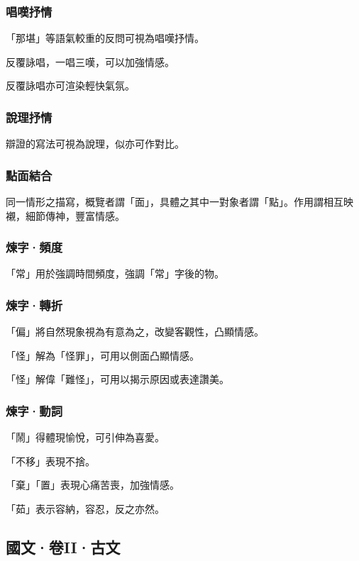 \documentclass{ctexart}
\begin{document}
\subsubsection*{唱嘆抒情}
「那堪」等語氣較重的反問可視為唱嘆抒情。
\par
反覆詠唱，一唱三嘆，可以加強情感。
\par
反覆詠唱亦可渲染輕快氣氛。
\subsubsection*{說理抒情}
辯證的寫法可視為說理，似亦可作對比。
\subsubsection*{點面結合}
同一情形之描寫，概覽者謂「面」，具體之其中一對象者謂「點」。作用謂相互映襯，細節傳神，豐富情感。
\subsubsection*{煉字·頻度}
「常」用於強調時間頻度，強調「常」字後的物。
\subsubsection*{煉字·轉折}
「偏」將自然現象視為有意為之，改變客觀性，凸顯情感。
\par
「怪」解為「怪罪」，可用以側面凸顯情感。
\par
「怪」解偉「難怪」，可用以揭示原因或表達讚美。
\subsubsection*{煉字·動詞}
「鬧」得體現愉悅，可引伸為喜愛。
\par
「不移」表現不捨。
\par
「棄」「置」表現心痛苦喪，加強情感。
\par
「茹」表示容納，容忍，反之亦然。
\subsection{國文·卷II·古文}
\end{document}
